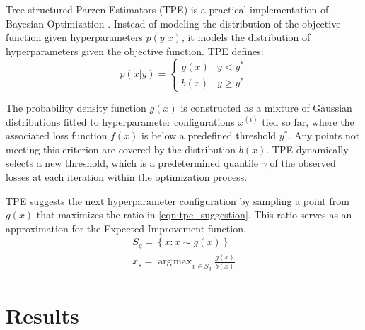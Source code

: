 \documentclass{IEEEtran}
\DeclareMathOperator*{\argmax}{arg\,max}
\begin{document}
            Tree-structured Parzen Estimators (TPE) is a practical implementation of Bayesian Optimization \cite{bergstra2011algorithms}. Instead of modeling the distribution of the objective function given hyperparameters $p(y|x)$, it models the distribution of hyperparameters given the objective function. TPE defines:
            \begin{equation}
                p(x|y) = \begin{cases}
                    g(x) & y < y^{*} \\
                    b(x) & y \geq y^{*}
                \end{cases}
            \end{equation}

            The probability density function $g(x)$ is constructed as a mixture of Gaussian distributions fitted to hyperparameter configurations ${x^{(i)}}$ tied so far, where the associated loss function $f(x)$ is below a predefined threshold $y^{*}$. Any points not meeting this criterion are covered by the distribution $b(x)$. TPE dynamically selects a new threshold, which is a predetermined quantile $\gamma$ of the observed losses at each iteration within the optimization process.

            TPE suggests the next hyperparameter configuration by sampling a point from $g(x)$ that maximizes the ratio in \eqref{eqn:tpe_suggestion}. This ratio serves as an approximation for the Expected Improvement function.
            \begin{equation} \label{eqn:tpe_suggestion}
                \begin{gathered}
                    S_g = \left\{x: x \sim g(x)\right\} \\
                    x_s = \argmax_{x \in S_g} \frac{g(x)}{b(x)}
                \end{gathered}
            \end{equation}

    \section{Results} \label{sec:results}
\end{document}
